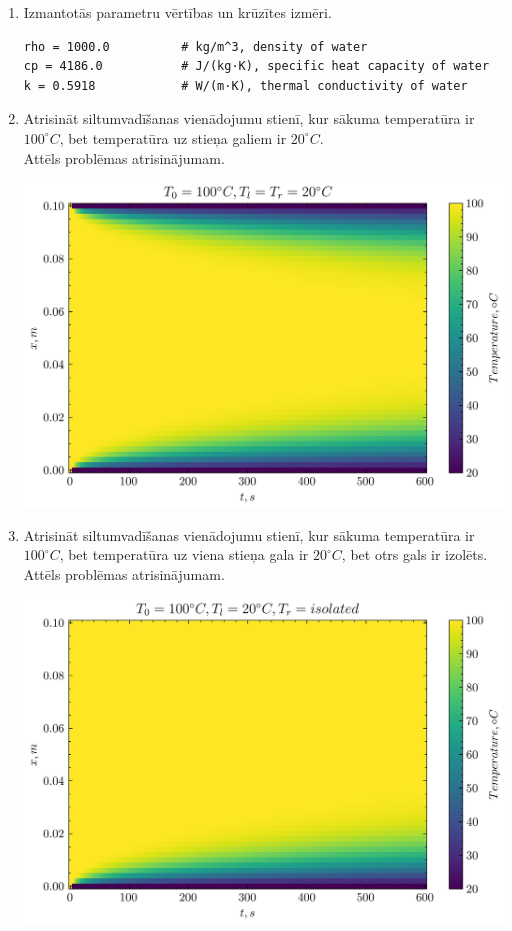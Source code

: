 \documentclass[12pt]{article}
\begin{document}
\begin{enumerate}
  \item Izmantotās parametru vērtības un krūzītes izmēri.
  \begin{verbatim}
rho = 1000.0          # kg/m^3, density of water
cp = 4186.0           # J/(kg·K), specific heat capacity of water
k = 0.5918            # W/(m·K), thermal conductivity of water
  \end{verbatim}
  \item Atrisināt siltumvadīšanas vienādojumu stienī, kur sākuma temperatūra ir $100^\circ C$, bet temperatūra uz stieņa galiem ir $20^\circ C$. \\ Attēls problēmas atrisinājumam.
\begin{center}
\includegraphics[]{2.1.png}
\end{center}
  \item Atrisināt siltumvadīšanas vienādojumu stienī, kur sākuma temperatūra ir $100^\circ C$, bet temperatūra uz viena stieņa gala ir $20^\circ C$, bet otrs gals ir izolēts. \\ Attēls problēmas atrisinājumam.
\begin{center}
\includegraphics[]{2.2.png}

\end{center}
\end{enumerate}
\end{document}
